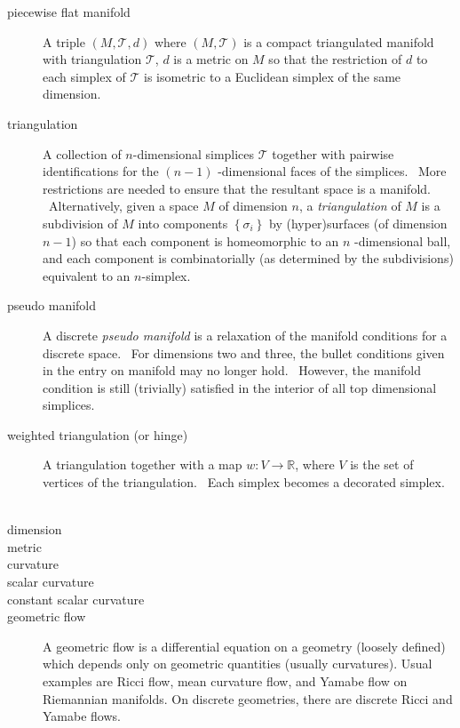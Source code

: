 \begin{description}
\item[piecewise flat manifold] A triple $\left( M,\mathcal{T},d\right) $
where $\left( M,\mathcal{T}\right) $ is a compact triangulated manifold with
triangulation $\mathcal{T}$, $d$ is a metric on $M$ so that the restriction
of $d$ to each simplex of $\mathcal{T}$ is isometric to a Euclidean simplex
of the same dimension. \ 

\item[triangulation] A collection of $n$-dimensional simplices $\mathcal{T}$
together with pairwise identifications for the $\left( n-1\right) $%
-dimensional faces of the simplices. \ More restrictions are needed to
ensure that the resultant space is a manifold. \ Alternatively, given a
space $M$ of dimension $n$, a \textit{triangulation} of $M$ is a subdivision
of $M$ into components $\left\{ \sigma _{i}\right\} $ by (hyper)surfaces (of
dimension $n-1$) so that each component is homeomorphic to an $n$%
-dimensional ball, and each component is combinatorially (as determined by
the subdivisions) equivalent to an $n$-simplex. \ 

\item[pseudo manifold] A discrete \textit{pseudo manifold} is a relaxation
of the manifold conditions for a discrete space. \ For dimensions two and
three, the bullet conditions given in the entry on manifold may no longer
hold. \ However, the manifold condition is still (trivially) satisfied in
the interior of all top dimensional simplices.

\item[weighted triangulation (or hinge)] A triangulation together with a map 
$w:V\rightarrow 
\mathbb{R}
$, where $V$ is the set of vertices of the triangulation. \ Each simplex
becomes a decorated simplex. \ 

\item[dimension] 

\item[metric] 

\item[curvature] 

\item[scalar curvature] 

\item[constant scalar curvature] 

\item[geometric flow] A geometric flow is a differential equation on a
geometry (loosely defined) which depends only on geometric quantities
(usually curvatures). Usual examples are Ricci flow, mean curvature flow,
and Yamabe flow on Riemannian manifolds. On discrete geometries, there are
discrete Ricci and Yamabe flows.


\end{description}
